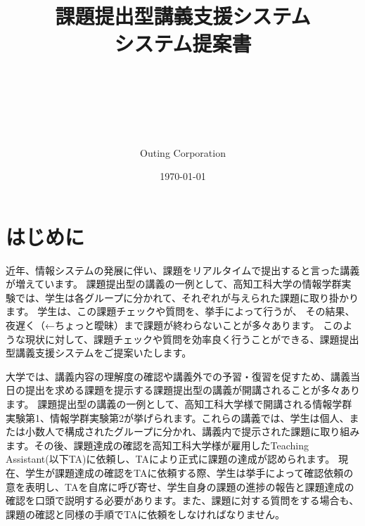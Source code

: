 \documentclass[a4j,titlepage]{ujarticle}
\title{
{課題提出型講義支援システム
\\
システム提案書}
\author{\\
\\
\\
\\
\\
Outing Corporation}
\date{\today}
}
\begin{document}
\maketitle


\tableofcontents



\clearpage


\section{はじめに}


近年、情報システムの発展に伴い、課題をリアルタイムで提出すると言った講義が増えています。 %
課題提出型の講義の一例として、高知工科大学の情報学群実験では、学生は各グループに分かれて、それぞれが与えられた課題に取り掛かります。
学生は、この課題チェックや質問を、挙手によって行うが、%
その結果、夜遅く（←ちょっと曖昧）まで課題が終わらないことが多々あります。
このような現状に対して、課題チェックや質問を効率良く行うことができる、課題提出型講義支援システムをご提案いたします。



大学では、講義内容の理解度の確認や講義外での予習・復習を促すため、講義当日の提出を求める課題を提示する課題提出型の講義が開講されることが多々あります。
課題提出型の講義の一例として、高知工科大学様で開講される情報学群実験第1、情報学群実験第2が挙げられます。これらの講義では、学生は個人、または小数人で構成されたグループに分かれ、講義内で提示された課題に取り組みます。その後、課題達成の確認を高知工科大学様が雇用したTeaching Assistant(以下TA)に依頼し、TAにより正式に課題の達成が認められます。
現在、学生が課題達成の確認をTAに依頼する際、学生は挙手によって確認依頼の意を表明し、TAを自席に呼び寄せ、学生自身の課題の進捗の報告と課題達成の確認を口頭で説明する必要があります。また、課題に対する質問をする場合も、課題の確認と同様の手順でTAに依頼をしなければなりません。
\end{document}
